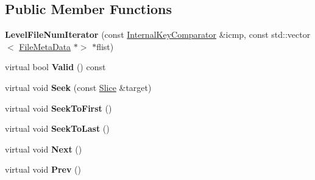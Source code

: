 \subsection*{Public Member Functions}
\begin{DoxyCompactItemize}
\item 
\mbox{\label{classleveldb_1_1_version_1_1_level_file_num_iterator_a0907248296b752dcea1e0265da0b812d}} 
{\bfseries Level\+File\+Num\+Iterator} (const \mbox{\hyperlink{classleveldb_1_1_internal_key_comparator}{Internal\+Key\+Comparator}} \&icmp, const std\+::vector$<$ \mbox{\hyperlink{structleveldb_1_1_file_meta_data}{File\+Meta\+Data}} $\ast$$>$ $\ast$flist)
\item 
\mbox{\label{classleveldb_1_1_version_1_1_level_file_num_iterator_a9bf0e045961ed325d37bfaa8b2c77e8b}} 
virtual bool {\bfseries Valid} () const
\item 
\mbox{\label{classleveldb_1_1_version_1_1_level_file_num_iterator_adbe855f4a783c2f578e1ff2fbb5259b2}} 
virtual void {\bfseries Seek} (const \mbox{\hyperlink{classleveldb_1_1_slice}{Slice}} \&target)
\item 
\mbox{\label{classleveldb_1_1_version_1_1_level_file_num_iterator_a8e5d34bf0c1e17e83bbb9941821a7ee2}} 
virtual void {\bfseries Seek\+To\+First} ()
\item 
\mbox{\label{classleveldb_1_1_version_1_1_level_file_num_iterator_ac7fafc33c049d1e33fdf9b5ae99f73d8}} 
virtual void {\bfseries Seek\+To\+Last} ()
\item 
\mbox{\label{classleveldb_1_1_version_1_1_level_file_num_iterator_a7f470d4bd4dd27ff653bd1e61ccfd759}} 
virtual void {\bfseries Next} ()
\item 
\mbox{\label{classleveldb_1_1_version_1_1_level_file_num_iterator_ab39c60a98d579590231034fdb665cb42}} 
virtual void {\bfseries Prev} ()
\item 
$$
\end{DoxyCompactItemize}
